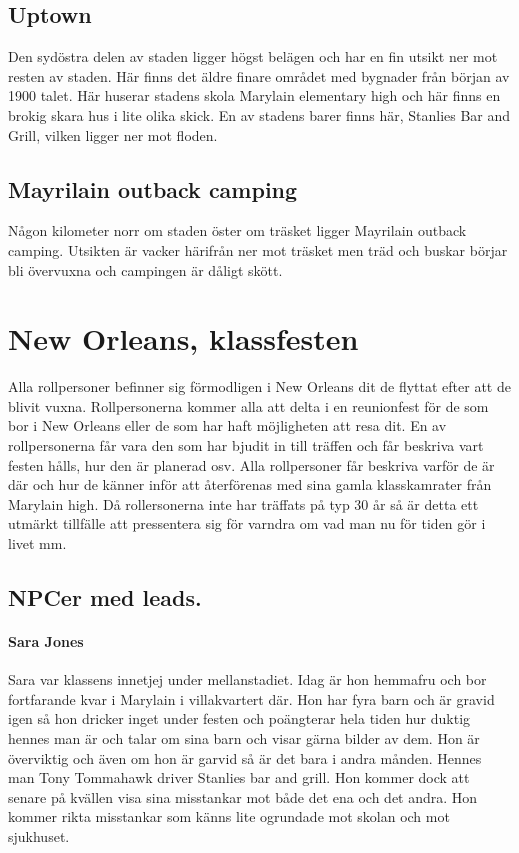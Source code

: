 \documentclass[a5paper,10pt]{report}
\begin{document}
\subsection{Uptown}
Den sydöstra delen av staden ligger högst belägen och har en fin utsikt ner mot resten av staden. Här finns det äldre finare området med bygnader från början av 1900 talet. Här huserar stadens skola Marylain elementary high och här finns en brokig skara hus i lite olika skick. En av stadens barer finns här, Stanlies Bar and Grill, vilken ligger ner mot floden.
\subsection{Mayrilain outback camping}
Någon kilometer norr om staden öster om träsket ligger Mayrilain outback camping. Utsikten är vacker härifrån ner mot träsket men träd och buskar börjar bli övervuxna och campingen är dåligt skött.
\section{New Orleans, klassfesten}
Alla rollpersoner befinner sig förmodligen i New Orleans dit de flyttat efter att de blivit vuxna. Rollpersonerna kommer alla att delta i en reunionfest för de som bor i New Orleans eller de som har haft möjligheten att resa dit. En av rollpersonerna får vara den som har bjudit in till träffen och får beskriva vart festen hålls, hur den är planerad osv. Alla rollpersoner får beskriva varför de är där och hur de känner inför att återförenas med sina gamla klasskamrater från Marylain high. Då rollersonerna inte har träffats på typ 30 år så är detta ett utmärkt tillfälle att pressentera sig för varndra om vad man nu för tiden gör i livet mm.
\subsection{NPCer med leads.}
\paragraph{Sara Jones}
Sara var klassens innetjej under mellanstadiet. Idag är hon hemmafru och bor fortfarande kvar i Marylain i villakvartert där. Hon har fyra barn och är gravid igen så hon dricker inget under festen och poängterar hela tiden hur duktig hennes man är och talar om sina barn och visar gärna bilder av dem. Hon är överviktig och även om hon är garvid så är det bara i andra månden. Hennes man Tony Tommahawk driver Stanlies bar and grill. Hon kommer dock att senare på kvällen visa sina misstankar mot både det ena och det andra. Hon kommer rikta misstankar som känns lite ogrundade mot skolan och mot sjukhuset.
\end{document}
